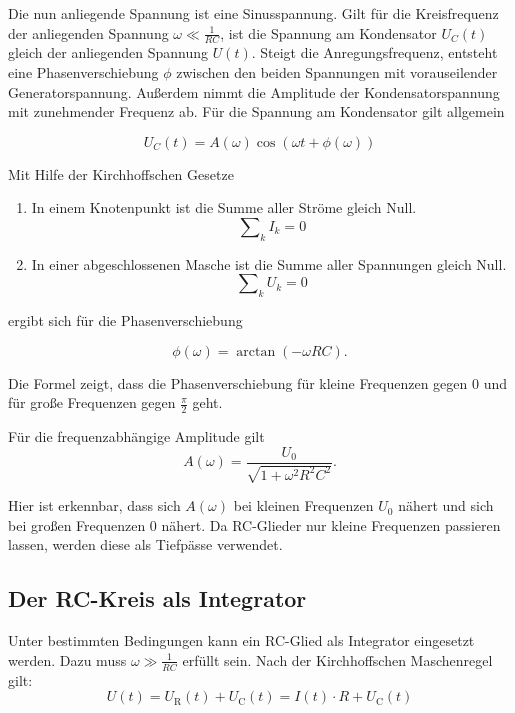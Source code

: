 Die nun anliegende Spannung ist eine Sinusspannung. Gilt für die Kreisfrequenz der anliegenden Spannung $\omega \ll \frac{1}{RC}$, ist die Spannung am Kondensator $U_C(t)$ gleich der anliegenden Spannung $U(t)$.
Steigt die Anregungsfrequenz, entsteht eine Phasenverschiebung $\phi$ zwischen den beiden Spannungen mit vorauseilender Generatorspannung. Außerdem nimmt die Amplitude der Kondensatorspannung mit zunehmender Frequenz ab. Für die Spannung am Kondensator gilt allgemein

\begin{equation}
  U_C(t) = A(\omega) \cos (\omega t + \phi(\omega))
\end{equation}

Mit Hilfe der Kirchhoffschen Gesetze
\begin{enumerate}
  \item In einem Knotenpunkt ist die Summe aller Ströme gleich Null.
  \begin{equation}
    \mathrm\sum_{k} I_k = 0
  \end{equation}
  \item In einer abgeschlossenen Masche ist die Summe aller Spannungen gleich Null.
  \begin{equation}
    \mathrm\sum_{k} U_k = 0
  \end{equation}
\end{enumerate}

ergibt sich für die Phasenverschiebung

\begin{equation}
  \label{eqn:phase}
  \phi(\omega) = \arctan(-\omega RC).
\end{equation}

Die Formel zeigt, dass die Phasenverschiebung für kleine Frequenzen gegen 0 und für große Frequenzen gegen $\frac{\pi}{2}$ geht.

Für die frequenzabhängige Amplitude gilt
\begin{equation}
  \label{eqn:amplitude}
  A(\omega) = \frac{U_0}{\sqrt{1 + \omega^2R^2C^2}}.
\end{equation}

Hier ist erkennbar, dass sich $A(\omega)$ bei kleinen Frequenzen $U_0$ nähert und sich bei großen Frequenzen 0 nähert. Da RC-Glieder nur kleine Frequenzen passieren lassen, werden diese als Tiefpässe verwendet.

\subsection{Der RC-Kreis als Integrator}
Unter bestimmten Bedingungen kann ein RC-Glied als Integrator eingesetzt werden. Dazu muss $\omega \gg \frac{1}{RC}$ erfüllt sein. Nach der Kirchhoffschen Maschenregel gilt:
\begin{equation}
  U(t) = U_\mathrm{R}(t) + U_\mathrm{C}(t) = I(t) \cdot R + U_\mathrm{C}(t)
\end{equation}

